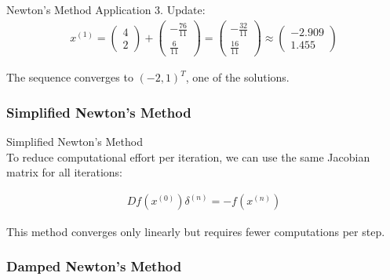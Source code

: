 \begin{example2}{Newton's Method Application}
3. Update:
   \begin{align*}
   x^{(1)} = \begin{pmatrix} 4 \\ 2 \end{pmatrix} + \begin{pmatrix} -\frac{76}{11} \\ \frac{6}{11} \end{pmatrix} = \begin{pmatrix} -\frac{32}{11} \\ \frac{16}{11} \end{pmatrix} \approx \begin{pmatrix} -2.909 \\ 1.455 \end{pmatrix}
   \end{align*}

The sequence converges to $(-2, 1)^T$, one of the solutions.
\end{example2}

\subsubsection{Simplified Newton's Method}

\begin{definition}{Simplified Newton's Method}\\
To reduce computational effort per iteration, we can use the same Jacobian matrix for all iterations:

\begin{align*}
Df(x^{(0)})\delta^{(n)} = -f(x^{(n)})
\end{align*}

This method converges only linearly but requires fewer computations per step.
\end{definition}

\subsubsection{Damped Newton's Method}


